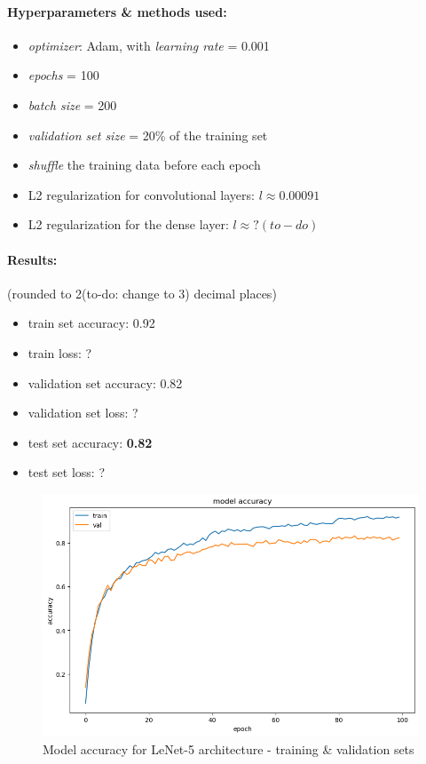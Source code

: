 \documentclass[12pt]{article}
\begin{document}
        \paragraph{Hyperparameters \& methods used:}
        \begin{itemize}
          \item \textit{optimizer}: Adam, with \textit{learning rate} = 0.001
          \item \textit{epochs} = 100
          \item \textit{batch size} = 200
          \item \textit{validation set size} = 20\% of the training set
          \item \textit{shuffle} the training data before each epoch
          \item L2 regularization for convolutional layers: $l \approx 0.00091$
          \item L2 regularization for the dense layer: $l \approx ?(to-do)$
        \end{itemize}
        \paragraph{Results:} (rounded to 2(to-do: change to 3) decimal places)
          \begin{itemize}
            \item train set accuracy: 0.92
            \item train loss: ?
            \item validation set accuracy: 0.82
            \item validation set loss: ?
            \item test set accuracy: \textbf{0.82}
            \item test set loss: ?
          \end{itemize}
              \begin{figure}[H]
                \includegraphics[width=\linewidth]{images/lenet.png}
                \caption{Model accuracy for LeNet-5 architecture - training \& validation sets}
                \label{fig:lenet}
              \end{figure}
\end{document}
